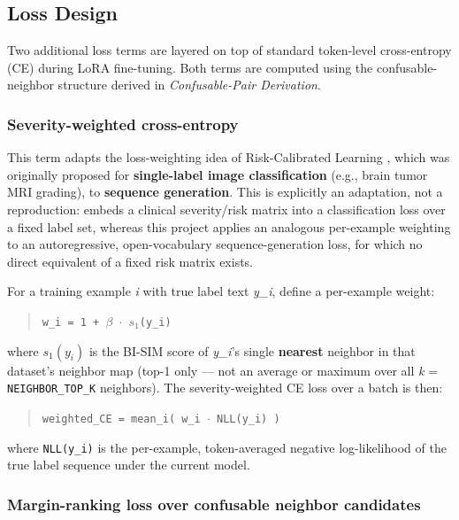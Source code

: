 \documentclass[fleqn,10pt]{wlpeerj}
\begin{document}
\subsection*{Loss Design}\label{sec:loss-design}

Two additional loss terms are layered on top of standard token-level cross-entropy (CE) during LoRA fine-tuning. Both terms are computed using the confusable-neighbor structure derived in \textit{Confusable-Pair Derivation}.

\subsubsection*{Severity-weighted cross-entropy}\label{sec:severity-weighted-ce}

This term adapts the loss-weighting idea of Risk-Calibrated Learning \citep{mohammadiseif2026risk}, which was originally proposed for \textbf{single-label image classification} (e.g., brain tumor MRI grading), to \textbf{sequence generation}. This is explicitly an adaptation, not a reproduction: \citeauthor{mohammadiseif2026risk} embeds a clinical severity/risk matrix into a classification loss over a fixed label set, whereas this project applies an analogous per-example weighting to an autoregressive, open-vocabulary sequence-generation loss, for which no direct equivalent of a fixed risk matrix exists.

For a training example \emph{i} with true label text \emph{y\_i}, define a per-example weight:

\begin{quote}
\texttt{w\_i = 1 + $\beta$ $\cdot$ $s_1$(y\_i)}
\end{quote}

where $s_1(y_i)$ is the BI-SIM score of \emph{y\_i}'s single \textbf{nearest} neighbor in that dataset's neighbor map (top-1 only --- not an average or maximum over all \emph{k} = \texttt{NEIGHBOR\_TOP\_K} neighbors). The severity-weighted CE loss over a batch is then:

\begin{quote}
\texttt{weighted\_CE = mean\_i( w\_i $\cdot$ NLL(y\_i) )}
\end{quote}

where \texttt{NLL(y\_i)} is the per-example, token-averaged negative log-likelihood of the true label sequence under the current model.

\subsubsection*{Margin-ranking loss over confusable neighbor candidates}\label{sec:margin-ranking}
\end{document}
